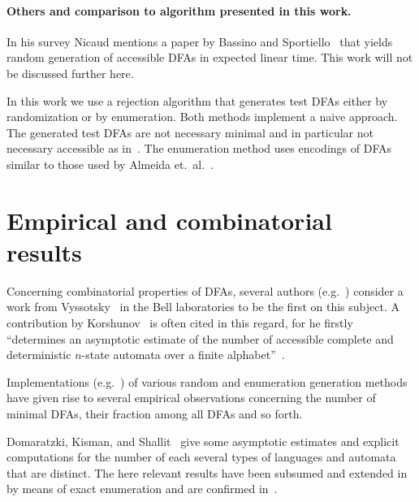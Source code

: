 \paragraph*{Others and comparison to algorithm presented in this work.}

In his survey Nicaud mentions a paper by Bassino and Sportiello~\cite{BS13} that yields random generation of accessible DFAs in expected linear time. This work will not be discussed further here.

In this work we use a rejection algorithm that generates test DFAs either by randomization or by enumeration. Both methods implement a naive approach. The generated test DFAs are not necessary minimal and in particular not necessary accessible as in~\cite{CN12}. The enumeration method uses encodings of DFAs similar to those used by Almeida et.\ al.~\cite{RMA05}.


\section{Empirical and combinatorial results}

Concerning combinatorial properties of DFAs, several authors (e.g.~\cite{BN07, DKS02, HJ14}) consider a work from Vyssotsky~\cite{Vys59} in the Bell laboratories to be the first on this subject. A contribution by Korshunov~\cite{Kor78} is often cited in this regard, for he firstly ``determines an asymptotic estimate of the number of accessible complete and deterministic $n$-state automata over a finite alphabet''~\cite{BDS11}.

Implementations (e.g.~\cite{AAA09, BDN07}) of various random and enumeration generation methods have given rise to several empirical observations concerning the number of minimal DFAs, their fraction among all DFAs and so forth.

Domaratzki, Kisman, and Shallit~\cite{DKS02} give some asymptotic estimates and explicit computations for the number of each several types of languages and automata that are distinct. The here relevant results have been subsumed and extended in~\cite[p. 8]{AMR09} by means of exact enumeration and are confirmed in~\cite{BDN07}.

